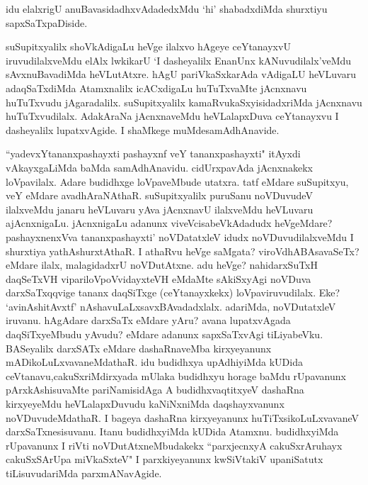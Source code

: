 \begin{artha}
idu elalxrigU anuBavasidadhxvAdadedxMdu `hi' shabadxdiMda shurxtiyu sapxSaTxpaDiside.
\end{artha}


\begin{artha}
suSupitxyalilx shoVkAdigaLu heVge ilalxvo hAgeye ceYtanayxvU iruvudilalxveMdu elAlx lwkikarU `I dasheyalilx EnanUnx kANuvudilalx'veMdu sAvxnuBavadiMda heVLutAtxre. hAgU pariVkaSxkarAda vAdigaLU heVLuvaru adaqSaTxdiMda Atamxnalilx icACxdigaLu huTuTxvaMte jAcnxnavu huTuTxvudu jAgaradalilx. suSupitxyalilx kamaRvukaSxyisidadx\-riMda jAcnxnavu huTuTxvudilalx. AdakAraNa jAcnxnaveMdu heVLalapxDuva ceYtanayxvu I dasheyalilx lupatxvAgide. I shaMkege muMde\break samAdhAnavide. 
\end{artha}

\begin{artha}
``yadevxYtananxpashayxti pashayxnf veY tananxpashayxti" itAyxdi vAkayxgaLiMda baMda samAdhAnavidu. cidUrxpavAda jAcnxnakekx loVpavilalx. Adare budidhxge loVpaveMbude utatxra. tatf eMdare suSupitxyu, veY eMdare avadhAraNAthaR. suSupitxyalilx puruSanu noVDuvudeV ilalxveMdu janaru heVLuvaru yAva jAcnxnavU ilalxveMdu heVLuvaru ajAcnxnigaLu. jAcnxnigaLu adanunx viveVcisabeVkAdadudx heVgeMdare? pashayxnenxVva tananxpashayxti' noVDatatxleV idudx noVDuvudilalxveMdu I shurxtiya yathAshurxtAthaR. I athaRvu heVge saMgata? viroVdhABAsavaSeTx? eMdare ilalx, malagidadxrU noVDutAtxne. adu heVge? nahidarxSuTxH daqSeTxVH vipariloVpoVvidayxteVH eMdaMte sAkiSxyAgi noVDuva darxSaTxqqvige tananx daqSiTxge (ceYtanayxkekx) loVpaviruvudilalx. Eke? `avinAshitAvxtf' nAshavuLaLxsavxBAvadadxlalx. adariMda, noVDutatxleV iruvanu. hAgAdare darxSaTx eMdare yAru? avana lupatxvAgada daqSiTxyeMbudu yAvudu? eMdare adanunx sapxSaTxvAgi tiLiyabeVku. BASeyalilx darxSATx eMdare dashaRnaveMba kirxyeyanunx mADikoLuLxvavaneMdathaR. idu budidhxya upAdhiyiMda kUDida ceVtanavu,\break cakuSxriMdirxyada mUlaka budidhxyu horage baMdu rUpavanunx pArxkAshisuvaMte pariNamisidAga A budidhxvaqtitxyeV dashaRna kirxyeyeMdu heVLalapxDuvudu kaNiNxniMda daqshayxvanunx noVDuvudeMdathaR. I bageya dashaRna kirxyeyanunx huTiTxsikoLuLxvavaneV darxSaTxnesisuvanu. Itanu budidhxyiMda kUDida Atamxnu. budidhxyiMda rUpavanunx I riVti noVDutAtxneMbudakekx ``parxjecnxyA cakuSxrAruhayx cakuSxSArUpa miVkaSxteV" I parxkiyeyanunx kwSiVtakiV upaniSatutx tiLisuvudariMda parxmANavAgide. 
\end{artha}%

